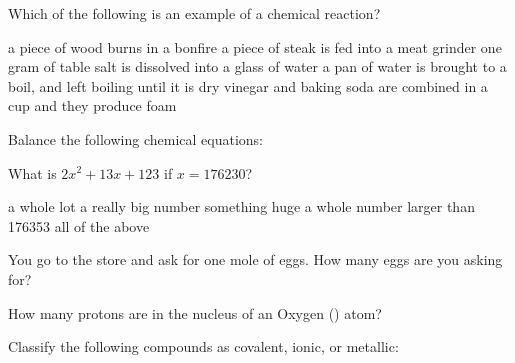 \documentclass[11pt,addpoints]{exam}   	%
\begin{document}
\begin{questions}
\question[5]
Which of the following is an example of a chemical reaction?

\begin{choices}
\choice a piece of wood burns in a bonfire
\choice a piece of steak is fed into a meat grinder
\choice one gram of table salt is dissolved into a glass of water
\choice a pan of water is brought to a boil, and left boiling until it is dry
\choice vinegar and baking soda are combined in a cup and they produce foam
\end{choices}
\vspace{.2in}

\question
Balance the following chemical equations:
\pagebreak

\question[1] What is $2x^2 + 13x + 123$ if $ x = 176230 $?
\begin{choices}
\choice a whole lot
\choice a really big number
\choice something huge
\choice a whole number larger than 176353
\choice all of the above
\end{choices}
\vspace{.2in}

\question[1] You go to the store and ask for one mole of eggs. How many eggs are you asking for?
\vspace{.2in}

\question[1] How many protons are in the nucleus of an Oxygen () atom?
\vspace{.2in}

\question
Classify the following compounds as covalent, ionic, or metallic:
\begin{parts}

\end{parts}
\end{questions}
\end{document}
